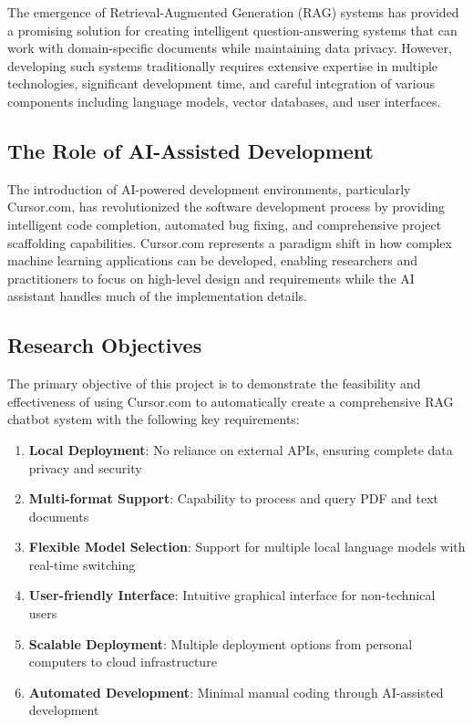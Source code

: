 \documentclass[12pt,letterpaper]{article}
\begin{document}
The emergence of Retrieval-Augmented Generation (RAG) systems has provided a promising solution for creating intelligent question-answering systems that can work with domain-specific documents while maintaining data privacy. However, developing such systems traditionally requires extensive expertise in multiple technologies, significant development time, and careful integration of various components including language models, vector databases, and user interfaces.

\subsection{The Role of AI-Assisted Development}

The introduction of AI-powered development environments, particularly Cursor.com, has revolutionized the software development process by providing intelligent code completion, automated bug fixing, and comprehensive project scaffolding capabilities. Cursor.com represents a paradigm shift in how complex machine learning applications can be developed, enabling researchers and practitioners to focus on high-level design and requirements while the AI assistant handles much of the implementation details.

\subsection{Research Objectives}

The primary objective of this project is to demonstrate the feasibility and effectiveness of using Cursor.com to automatically create a comprehensive RAG chatbot system with the following key requirements:

\begin{enumerate}
    \item \textbf{Local Deployment}: No reliance on external APIs, ensuring complete data privacy and security
    \item \textbf{Multi-format Support}: Capability to process and query PDF and text documents
    \item \textbf{Flexible Model Selection}: Support for multiple local language models with real-time switching
    \item \textbf{User-friendly Interface}: Intuitive graphical interface for non-technical users
    \item \textbf{Scalable Deployment}: Multiple deployment options from personal computers to cloud infrastructure
    \item \textbf{Automated Development}: Minimal manual coding through AI-assisted development
\end{enumerate}
\end{document}
